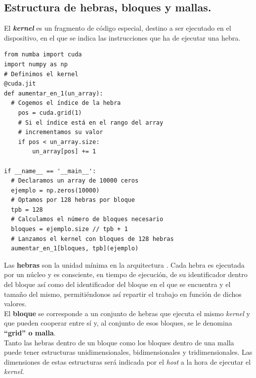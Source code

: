 \subsection{Estructura de hebras, bloques y mallas.}
El \textbf{\textit{kernel}} es un fragmento de código especial, destino a ser ejecutado en el dispositivo, en el que se indica las instrucciones que ha de ejecutar una hebra.\\
\begin{code}
\begin{verbatim}
from numba import cuda
import numpy as np
# Definimos el kernel
@cuda.jit
def aumentar_en_1(un_array):
  # Cogemos el índice de la hebra
    pos = cuda.grid(1)
    # Si el índice está en el rango del array
    # incrementamos su valor
    if pos < un_array.size:
        un_array[pos] += 1

if __name__ == '__main__':
  # Declaramos un array de 10000 ceros
  ejemplo = np.zeros(10000)
  # Optamos por 128 hebras por bloque
  tpb = 128
  # Calculamos el número de bloques necesario
  bloques = ejemplo.size // tpb + 1
  # Lanzamos el kernel con bloques de 128 hebras
  aumentar_en_1[bloques, tpb](ejemplo)
\end{verbatim}
\label{code:numbaexample}
\end{code}

Las \textbf{hebras} son la unidad mínima en la arquitectura \cudanospace. Cada hebra es ejecutada por un núcleo \cuda y es consciente, en tiempo de ejecución, de su identificador dentro del bloque así como del identificador del bloque en el que se encuentra y el tamaño del mismo, permitiéndonos así repartir el trabajo en función de dichos valores.\\

El \textbf{bloque} se corresponde a un conjunto de hebras que ejecuta el mismo \textit{kernel} y que pueden cooperar entre sí y, al conjunto de esos bloques, se le denomina \textbf{``grid'' o malla}. \\

Tanto las hebras dentro de un bloque como los bloques dentro de una malla puede tener estructuras unidimensionales, bidimensionales y tridimensionales. Las dimensiones de estas estructuras será indicada por el \textit{host} a la hora de ejecutar el \textit{kernel}.\\

